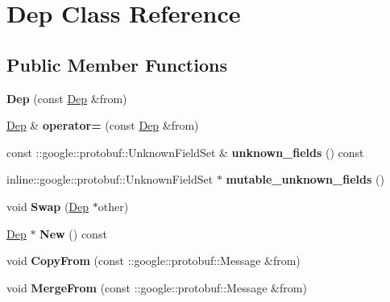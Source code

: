 \hypertarget{classDep}{
\section{Dep Class Reference}
\label{classDep}
}
\subsection*{Public Member Functions}
\begin{DoxyCompactItemize}
\item 
\hypertarget{classDep_a80362e936565b55abb269a18fde4dc59}{
{\bfseries Dep} (const \hyperlink{classDep}{Dep} \&from)}
\label{classDep_a80362e936565b55abb269a18fde4dc59}

\item 
\hypertarget{classDep_a87fdb64571ed9949e3fa5acdb9b367f9}{
\hyperlink{classDep}{Dep} \& {\bfseries operator=} (const \hyperlink{classDep}{Dep} \&from)}
\label{classDep_a87fdb64571ed9949e3fa5acdb9b367f9}

\item 
\hypertarget{classDep_a03cf321c0a637f65d4775ee8b63e2438}{
const ::google::protobuf::UnknownFieldSet \& {\bfseries unknown\_\-fields} () const }
\label{classDep_a03cf321c0a637f65d4775ee8b63e2438}

\item 
\hypertarget{classDep_af6070821655e8abd2054d0248896ed71}{
inline::google::protobuf::UnknownFieldSet $\ast$ {\bfseries mutable\_\-unknown\_\-fields} ()}
\label{classDep_af6070821655e8abd2054d0248896ed71}

\item 
\hypertarget{classDep_a89fd3d7654cbf49a112ee30ebe30a8f4}{
void {\bfseries Swap} (\hyperlink{classDep}{Dep} $\ast$other)}
\label{classDep_a89fd3d7654cbf49a112ee30ebe30a8f4}

\item 
\hypertarget{classDep_add63de81fa6478b899aff7ae37b8dff1}{
\hyperlink{classDep}{Dep} $\ast$ {\bfseries New} () const }
\label{classDep_add63de81fa6478b899aff7ae37b8dff1}

\item 
\hypertarget{classDep_a26c81c96d8bc499af3e3190127ae4f14}{
void {\bfseries CopyFrom} (const ::google::protobuf::Message \&from)}
\label{classDep_a26c81c96d8bc499af3e3190127ae4f14}

\item 
\hypertarget{classDep_a8521cee2d2c20cc3374caee792879d24}{
void {\bfseries MergeFrom} (const ::google::protobuf::Message \&from)}
\label{classDep_a8521cee2d2c20cc3374caee792879d24}


\end{DoxyCompactItemize}
